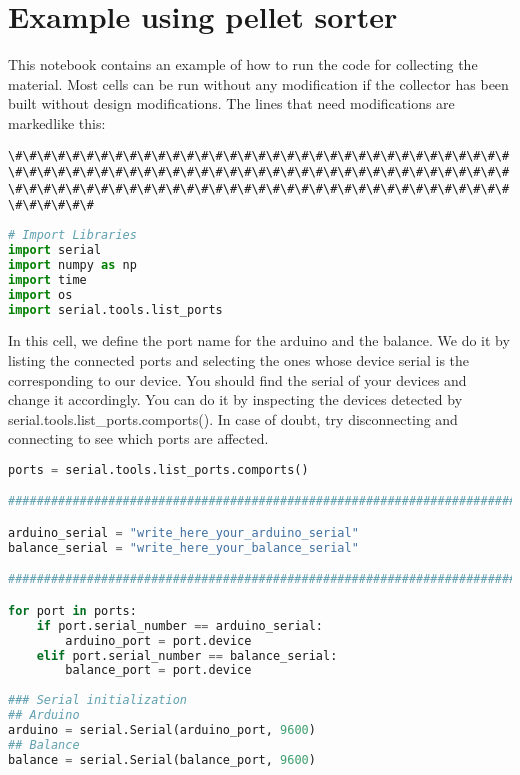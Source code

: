 \section{Example using pellet sorter}\label{example-using-pellet-sorter}

This notebook contains an example of how to run the code for collecting
the material. Most cells can be run without any modification if the
collector has been built without design modifications. The lines that
need modifications are markedlike this:

\passthrough{\lstinline!\#\#\#\#\#\#\#\#\#\#\#\#\#\#\#\#\#\#\#\#\#\#\#\#\#\#\#\#\#\#\#\#\#\#\#\#\#\#\#\#\#\#\#\#\#\#\#\#\#\#\#\#\#\#\#\#\#\#\#\#\#\#\#\#\#\#\#\#\#\#\#\#\#\#\#\#\#\#\#\#\#\#\#\#\#\#\#\#\#\#\#\#\#\#\#\#\#\#\#\#\#\#\#\#\#\#\#\#\#\#\#!}

\begin{lstlisting}[language=Python]
# Import Libraries
import serial
import numpy as np
import time
import os
import serial.tools.list_ports
\end{lstlisting}

In this cell, we define the port name for the arduino and the balance.
We do it by listing the connected ports and selecting the ones whose
device serial is the corresponding to our device. You should find the
serial of your devices and change it accordingly. You can do it by
inspecting the devices detected by serial.tools.list\_ports.comports().
In case of doubt, try disconnecting and connecting to see which ports
are affected.

\begin{lstlisting}[language=Python]
ports = serial.tools.list_ports.comports()

###############################################################################################################

arduino_serial = "write_here_your_arduino_serial"
balance_serial = "write_here_your_balance_serial"

###############################################################################################################

for port in ports:
    if port.serial_number == arduino_serial:
        arduino_port = port.device
    elif port.serial_number == balance_serial:
        balance_port = port.device
        
### Serial initialization
## Arduino
arduino = serial.Serial(arduino_port, 9600)
## Balance
balance = serial.Serial(balance_port, 9600)
\end{lstlisting}

